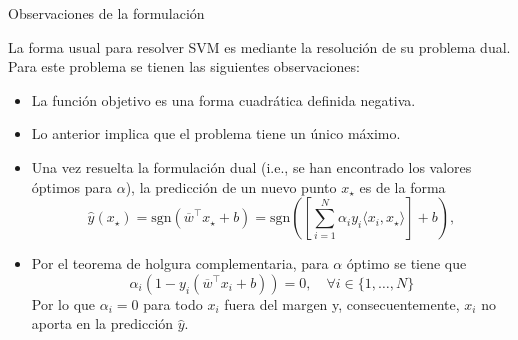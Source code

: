 \documentclass[9pt]{beamer}
\begin{document}
\begin{frame}{Observaciones de la formulación}

La forma usual para resolver SVM es mediante la resolución de su problema dual. Para este problema se tienen las siguientes observaciones:

\begin{itemize}
	\item La función objetivo es una forma cuadrática definida negativa.\pause
	\item Lo anterior implica que el problema tiene un único máximo.\pause
	\item Una vez resuelta la formulación dual (i.e., se han encontrado los valores óptimos para $\alpha$), la predicción de un nuevo punto $x_\star$ es de la forma 
\begin{equation*}
 	\hat{y}(x_\star)= \text{sgn} (\overline{w}^\top x_\star + b) = \text{sgn}\left(\left[\sum\limits_{i=1}^{N} \alpha_i y_i \langle x_i, x_\star\rangle\right] + b\right),
 \end{equation*}\pause
 
\item Por el teorema de holgura complementaria, para $\alpha$ óptimo se tiene que
\begin{equation*}
	\alpha_i \left(1-y_i (\overline{w}^\top x_i +b)\right) = 0,\quad \forall i\in\{1,\ldots,N\}
\end{equation*}
Por lo que $\alpha_i=0$ para todo $x_i$ fuera del margen y, consecuentemente, $x_i$ no aporta en la predicción $\hat{y}$.

\end{itemize}
	
\end{frame}
\end{document}
